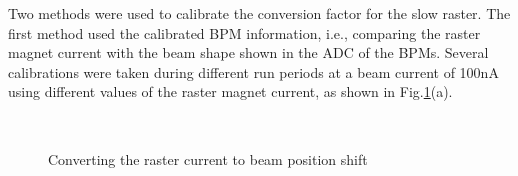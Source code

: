 \documentclass[english,review,number,sort&compress]{elsarticle}
\begin{document}
Two methods were used to calibrate the conversion factor for the slow raster. The first method used the calibrated BPM information, i.e., comparing the raster magnet current with the beam shape shown in the ADC of the BPMs. Several calibrations were taken during different run periods at a beam current of 100nA using different values of the raster magnet current, as shown in Fig.\ref{fig:Slow-raster-size}(a). 
\begin{figure}[tbph]
\begin{centering}
$\quad$$\quad$
\par\end{centering}

\protect\caption{\label{fig:Slow-raster-size}Converting the raster current to beam position shift}
\end{figure}
\end{document}
